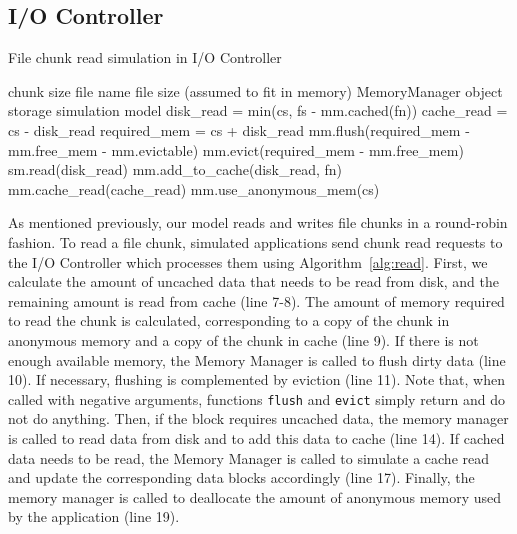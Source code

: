 \documentclass[conference]{IEEEtran}
\newcommand{\Desc}[2]{\State \makebox[2em][l]{#1}#2}
\begin{document}
    \subsection{I/O Controller}

    \begin{algorithm}\caption{File chunk read simulation in I/O Controller}
    \label{alg:read}
        \small
        \begin{algorithmic}[1]
        \Input
            \Desc{cs}{chunk size}
            \Desc{fn}{file name}
            \Desc{fs}{file size (assumed to fit in memory)}
            \Desc{mm}{MemoryManager object}
            \Desc{sm}{storage simulation model}
           \EndInput
           \State disk\_read = min(cs, fs - mm.cached(fn)) 
           \State cache\_read = cs - disk\_read 
           \State required\_mem = cs + disk\_read
           \State mm.flush(required\_mem - mm.free\_mem - mm.evictable)
           \State mm.evict(required\_mem - mm.free\_mem)
             
           \State sm.read(disk\_read)
           \State mm.add\_to\_cache(disk\_read, fn)
           \EndIf
            
           \State mm.cache\_read(cache\_read)
        \EndIf
        \State mm.use\_anonymous\_mem(cs)
        \end{algorithmic}
    \end{algorithm}
    As mentioned previously, our model reads and writes file chunks in a
    round-robin fashion. To read a file chunk, simulated applications send
    chunk read requests to the I/O Controller which processes them using
    Algorithm~\ref{alg:read}. First, we calculate the amount of uncached
    data that needs to be read from disk, and the remaining amount is read
    from cache (line 7-8). The amount of memory required to read the chunk
    is calculated, corresponding to a copy of the chunk in anonymous memory
    and a copy of the chunk in cache (line 9).
    If there is not enough available memory, the Memory Manager is called
    to flush dirty data (line 10). If necessary, flushing is complemented by
    eviction (line 11). Note that, when called with negative arguments, functions
    \texttt{flush} and \texttt{evict} simply return and do not do anything. Then,
    if the block requires
    uncached data, the memory manager is called to read data from disk and to add this
    data to cache (line 14).
    If cached data needs to be read, the Memory Manager is called to simulate
    a cache read  and update the corresponding data blocks accordingly (line 17).
    Finally, the memory manager is called to deallocate the amount of anonymous memory used by the application (line 19).
\end{document}
